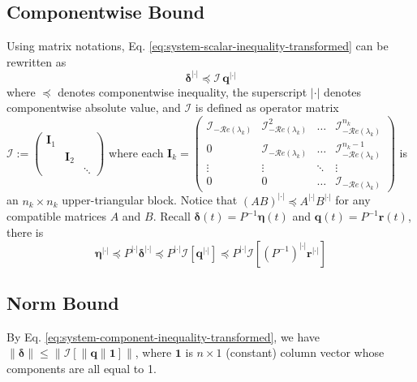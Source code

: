 \documentclass[]{uai2023}
\newcommand{\vect}[1]{\mathbf{#1}}
\newcommand{\Err}{\eta}
\newcommand{\I}{\mathcal{I}}
\renewcommand{\Re}[1]{\mathcal{R}e\left(#1\right)}
\newcommand{\abs}{|\cdot|}
\begin{document}
\subsection{Componentwise Bound}
    Using matrix notations, Eq. \ref{eq:system-scalar-inequality-transformed} can be rewritten as
    \begin{equation} \label{eq:system-component-inequality-transformed}
        \pmb{\delta}^{\abs} \preceq \pmb{\I}\,\vect{q}^{\abs}
    \end{equation}
    where $\preceq$ denotes componentwise inequality, the superscript $\abs$ denotes componentwise absolute value, and $\pmb{\I}$ is defined as operator matrix $\pmb{\I} := \begin{pmatrix} \vect{I}_1 \\ & \vect{I}_2 \\ && \ddots \end{pmatrix}$ where each $\vect{I}_k = \begin{pmatrix}
        \I_{-\Re{\lambda_k}} & \I_{-\Re{\lambda_k}}^2 & \dots &\I_{-\Re{\lambda_k}}^{n_k} \\[1ex]
        0 & \I_{-\Re{\lambda_k}} & \dots &\I_{-\Re{\lambda_k}}^{n_k-1} \\
        \vdots & \vdots & \ddots & \vdots \\
        0 & 0 & \dots & \I_{-\Re{\lambda_k}}
    \end{pmatrix}$ is an $n_k \times n_k$ upper-triangular block.
    Notice that $(AB)^{\abs} \preceq A^{\abs} B^{\abs}$ for any compatible matrices $A$ and $B$. Recall $\pmb{\delta}(t) = P^{-1}\pmb{\Err}(t)$ and $\pmb{q}(t) = P^{-1} \vect{r}(t)$, there is
    \begin{equation}
        \pmb{\Err}^{\abs} 
        \preceq P^{\abs}\pmb{\delta}^{\abs} 
        \preceq P^{\abs} \pmb{\I} \left[\vect{q}^{\abs} \right]
        \preceq P^{\abs} \pmb{\I} \left[(P^{-1})^{\abs} \vect{r}^{\abs}\right]
    \end{equation}
\subsection{Norm Bound}
    By Eq. \ref{eq:system-component-inequality-transformed}, we have $ \|\pmb{\delta}\| \leq \big\|\pmb{\I} [\|\vect{q}\| \vect{1}]\big\|$, where $\vect{1}$ is $n \times 1$ (constant) column vector whose components are all equal to 1.
\end{document}
